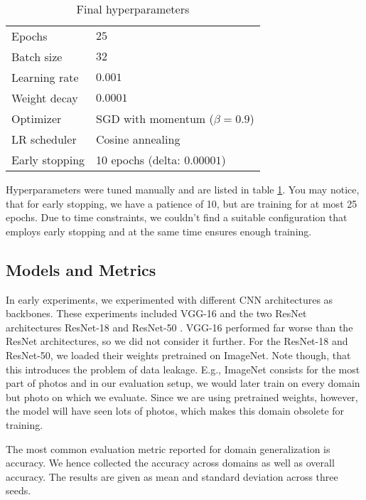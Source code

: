 \begin{table}
    \centering
    \caption{Final hyperparameters}
    \begin{tabular}{l | l}
        \toprule
        Epochs & $25$ \\
        Batch size & $32$ \\
        Learning rate & $0.001$ \\
        Weight decay & $0.0001$ \\
        Optimizer & SGD with momentum ($\beta = 0.9$) \\
        LR scheduler & Cosine annealing \\
        Early stopping & 10 epochs (delta: $0.00001$) \\
        \bottomrule
    \end{tabular}
    \label{tab:hyperparameters}
\end{table}

Hyperparameters were tuned manually and are listed in table \ref{tab:hyperparameters}. You may notice, that for early stopping, we have a patience of 10, but are training for at most 25 epochs. Due to time constraints, we couldn't find a suitable configuration that employs early stopping and at the same time ensures enough training.

\subsection{Models and Metrics}

In early experiments, we experimented with different CNN architectures as backbones. These experiments included VGG-16 \citep{vgg-16_ref} and the two ResNet architectures ResNet-18 and ResNet-50 \citep{resnet_ref}. VGG-16 performed far worse than the ResNet architectures, so we did not consider it further. For the ResNet-18 and ResNet-50, we loaded their weights pretrained on ImageNet. Note though, that this introduces the problem of data leakage. E.g., ImageNet consists for the most part of photos and in our evaluation setup, we would later train on every domain but photo on which we evaluate. Since we are using pretrained weights, however, the model will have seen lots of photos, which makes this domain obsolete for training.

The most common evaluation metric reported for domain generalization is accuracy. We hence collected the accuracy across domains as well as overall accuracy. The results are given as mean and standard deviation across three seeds.